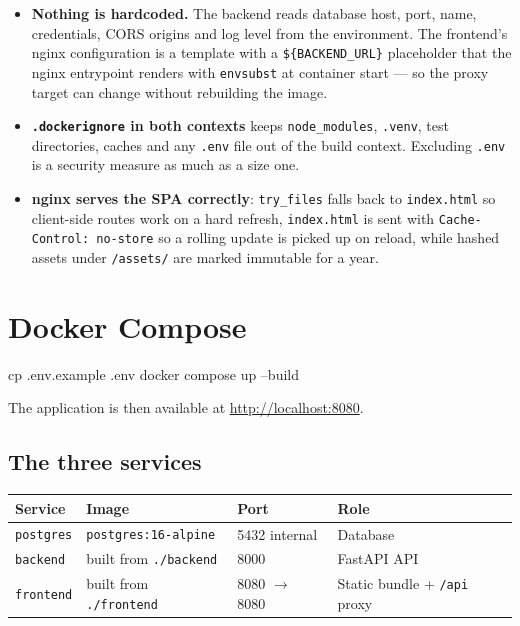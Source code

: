 \documentclass[10pt,a4paper]{article}
\newcommand{\cd}[1]{\texttt{\small #1}}
\begin{document}
\begin{itemize}
  \item \textbf{Nothing is hardcoded.} The backend reads database host, port,
        name, credentials, CORS origins and log level from the environment.
        The frontend's nginx configuration is a template with a
        \cd{\$\{BACKEND\_URL\}} placeholder that the nginx entrypoint renders
        with \cd{envsubst} at container start --- so the proxy target can
        change without rebuilding the image.
  \item \textbf{\cd{.dockerignore} in both contexts} keeps \cd{node\_modules},
        \cd{.venv}, test directories, caches and any \cd{.env} file out of the
        build context. Excluding \cd{.env} is a security measure as much as a
        size one.
  \item \textbf{nginx serves the SPA correctly}: \cd{try\_files} falls back to
        \cd{index.html} so client-side routes work on a hard refresh,
        \cd{index.html} is sent with \cd{Cache-Control: no-store} so a rolling
        update is picked up on reload, while hashed assets under \cd{/assets/}
        are marked immutable for a year.
\end{itemize}

\section{Docker Compose}

\begin{code}
cp .env.example .env
docker compose up --build
\end{code}

The application is then available at \url{http://localhost:8080}.

\subsection{The three services}

\begin{center}
\begin{tabular}{@{}llll@{}}
\toprule
\textbf{Service} & \textbf{Image} & \textbf{Port} & \textbf{Role} \\
\midrule
\cd{postgres} & \cd{postgres:16-alpine}   & 5432 internal & Database \\
\cd{backend}  & built from \cd{./backend} & 8000          & FastAPI API \\
\cd{frontend} & built from \cd{./frontend}& 8080 $\rightarrow$ 8080 & Static bundle + \cd{/api} proxy \\
\bottomrule
\end{tabular}
\end{center}
\end{document}
